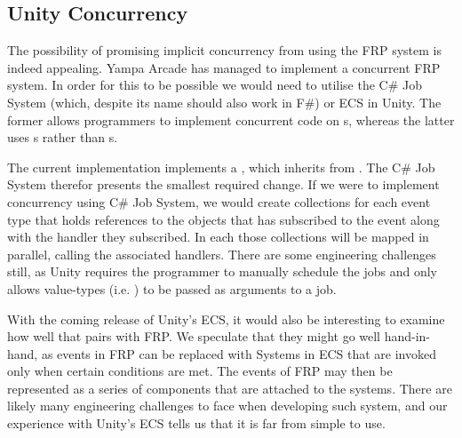 \subsection{Unity Concurrency}
The possibility of promising implicit concurrency from using the \gls{FRP} system is indeed appealing. Yampa Arcade has managed to implement a concurrent \gls{FRP} system\cite{courtney2003yampa}. In order for this to be possible we would need to utilise the C\# Job System (which, despite its name should also work in F\#) or \gls{ECS} in Unity. The former allows programmers to implement concurrent code on s, whereas the latter uses s rather than s. 

The current implementation implements a , which inherits from . The C\# Job System therefor presents the smallest required change. If we were to implement concurrency using C\# Job System, we would create collections for each event type that holds references to the objects that has subscribed to the event along with the handler they subscribed. In each  those collections will be mapped in parallel, calling the associated handlers. There are some engineering challenges still, as Unity requires the programmer to manually schedule the jobs and only allows value-types (i.e. ) to be passed as arguments to a job.

With the coming release of Unity's \gls{ECS}, it would also be interesting to examine how well that pairs with \gls{FRP}. We speculate that they might go well hand-in-hand, as events in \gls{FRP} can be replaced with Systems in \gls{ECS} that are invoked only when certain conditions are met. The events of \gls{FRP} may then be represented as a series of components that are attached to the systems. There are likely many engineering challenges to face when developing such system, and our experience with Unity's \gls{ECS} tells us that it is far from simple to use.